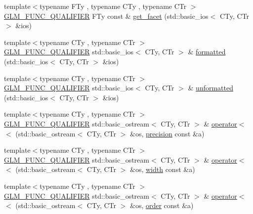 \begin{DoxyCompactItemize}
\item 
{\footnotesize template$<$typename F\+Ty , typename C\+Ty , typename C\+Tr $>$ }\\\hyperlink{setup_8hpp_a33fdea6f91c5f834105f7415e2a64407}{G\+L\+M\+\_\+\+F\+U\+N\+C\+\_\+\+Q\+U\+A\+L\+I\+F\+I\+ER} F\+Ty const  \& \hyperlink{namespaceglm_1_1io_a9e8927cf032254b0eee4ec650286e1f9}{get\+\_\+facet} (std\+::basic\+\_\+ios$<$ C\+Ty, C\+Tr $>$ \&ios)
\item 
{\footnotesize template$<$typename C\+Ty , typename C\+Tr $>$ }\\\hyperlink{setup_8hpp_a33fdea6f91c5f834105f7415e2a64407}{G\+L\+M\+\_\+\+F\+U\+N\+C\+\_\+\+Q\+U\+A\+L\+I\+F\+I\+ER} std\+::basic\+\_\+ios$<$ C\+Ty, C\+Tr $>$ \& \hyperlink{namespaceglm_1_1io_a61bbd0ea648623b0b07215a986bd5aa5}{formatted} (std\+::basic\+\_\+ios$<$ C\+Ty, C\+Tr $>$ \&ios)
\item 
{\footnotesize template$<$typename C\+Ty , typename C\+Tr $>$ }\\\hyperlink{setup_8hpp_a33fdea6f91c5f834105f7415e2a64407}{G\+L\+M\+\_\+\+F\+U\+N\+C\+\_\+\+Q\+U\+A\+L\+I\+F\+I\+ER} std\+::basic\+\_\+ios$<$ C\+Ty, C\+Tr $>$ \& \hyperlink{namespaceglm_1_1io_a833a8c96b3d84f7aa76e0c3e6845503e}{unformatted} (std\+::basic\+\_\+ios$<$ C\+Ty, C\+Tr $>$ \&ios)
\item 
{\footnotesize template$<$typename C\+Ty , typename C\+Tr $>$ }\\\hyperlink{setup_8hpp_a33fdea6f91c5f834105f7415e2a64407}{G\+L\+M\+\_\+\+F\+U\+N\+C\+\_\+\+Q\+U\+A\+L\+I\+F\+I\+ER} std\+::basic\+\_\+ostream$<$ C\+Ty, C\+Tr $>$ \& \hyperlink{namespaceglm_1_1io_ac52a8c5f8ea189f5bae2e5b8e382675f}{operator$<$$<$} (std\+::basic\+\_\+ostream$<$ C\+Ty, C\+Tr $>$ \&os, \hyperlink{structglm_1_1io_1_1precision}{precision} const \&a)
\item 
{\footnotesize template$<$typename C\+Ty , typename C\+Tr $>$ }\\\hyperlink{setup_8hpp_a33fdea6f91c5f834105f7415e2a64407}{G\+L\+M\+\_\+\+F\+U\+N\+C\+\_\+\+Q\+U\+A\+L\+I\+F\+I\+ER} std\+::basic\+\_\+ostream$<$ C\+Ty, C\+Tr $>$ \& \hyperlink{namespaceglm_1_1io_ac4783e4e3b0384619625d5d2d00c27b8}{operator$<$$<$} (std\+::basic\+\_\+ostream$<$ C\+Ty, C\+Tr $>$ \&os, \hyperlink{structglm_1_1io_1_1width}{width} const \&a)
\item 
{\footnotesize template$<$typename C\+Ty , typename C\+Tr $>$ }\\\hyperlink{setup_8hpp_a33fdea6f91c5f834105f7415e2a64407}{G\+L\+M\+\_\+\+F\+U\+N\+C\+\_\+\+Q\+U\+A\+L\+I\+F\+I\+ER} std\+::basic\+\_\+ostream$<$ C\+Ty, C\+Tr $>$ \& \hyperlink{namespaceglm_1_1io_a4dab7c825ecbd918643ed9fc9ef4ecb6}{operator$<$$<$} (std\+::basic\+\_\+ostream$<$ C\+Ty, C\+Tr $>$ \&os, \hyperlink{structglm_1_1io_1_1order}{order} const \&a)
\end{DoxyCompactItemize}


